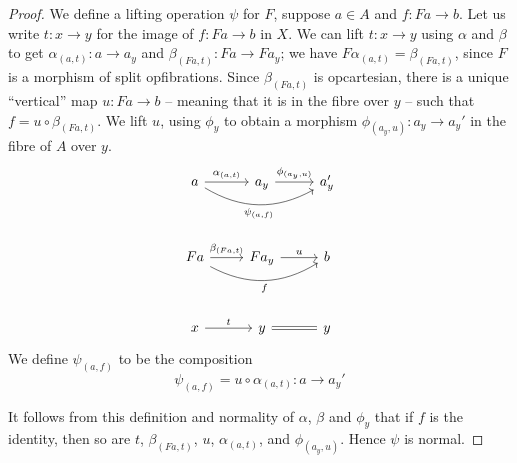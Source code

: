 \begin{proof}
  We define a lifting operation $\psi$ for $F$,
  suppose $a \in A$ and $f : F a \to b$.
  Let us write $t : x \to y$ for the image of $f : F a \to b$ in $X$.
  We can lift $t : x \to y$ using $\alpha$ and $\beta$ to get 
  $\alpha_{(a,t)} : a \to a_y$ and $\beta_{(F a, t)} : F a \to F a_y$;
  we have $F \alpha_{(a,t)} = \beta_{(F a, t)}$,
  since $F$ is a morphism of split opfibrations.
  Since $\beta_{(F a, t)}$ is opcartesian, 
  there is a unique ``vertical'' map $u : F a \to b$ --
  meaning that it is in the fibre over $y$ --
  such that $f = u \circ \beta_{(F a, t)}$.
  We lift $u$, using $\phi_y$ to obtain a morphism
  $\phi_{(a_y,u)} : a_y \to a_y'$ in the fibre of $A$ over $y$.
  \[\begin{tikzcd}
    a & {a_y} & {a_y'} \\
    \\
    Fa & {F a_y} & b \\
    \\
    x & y & y
    \arrow["{\alpha_{(a,t)}}", from=1-1, to=1-2]
    \arrow["{\psi_{(a,f)}}"', bend right, from=1-1, to=1-3]
    \arrow["{\phi_{(a_y,u)}}", from=1-2, to=1-3]
    \arrow["{\beta_{(F a, t)}}", from=3-1, to=3-2]
    \arrow["f"', bend right, from=3-1, to=3-3]
    \arrow["u", from=3-2, to=3-3]
    \arrow["t", from=5-1, to=5-2]
    \arrow[equals, from=5-2, to=5-3]
  \end{tikzcd}\]
  We define $\psi_{(a,f)}$ to be the composition
  \[\psi_{(a,f)} = u \circ \alpha_{(a,t)} : a \to a_y'\]

  It follows from this definition
  and normality of $\alpha$, $\beta$ and $\phi_y$
  that if $f$ is the identity,
  then so are $t$, $\beta_{(F a, t)}$, $u$, $\alpha_{(a,t)}$,
  and ${\phi_{(a_y,u)}}$.
  Hence $\psi$ is normal.


\end{proof}
